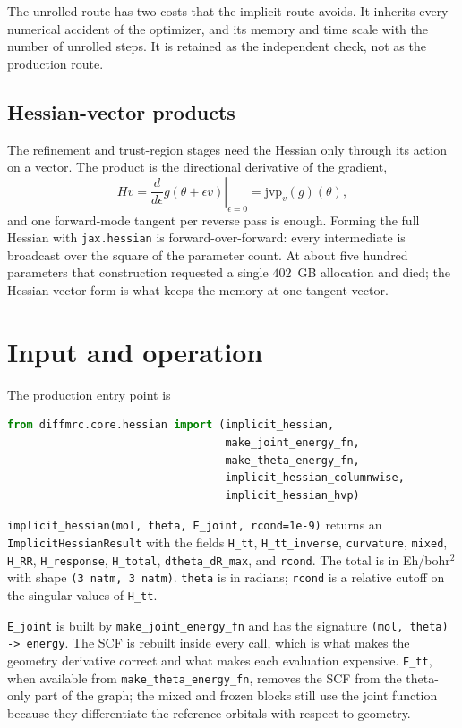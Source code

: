 The unrolled route has two costs that the implicit route avoids.  It
inherits every numerical accident of the optimizer, and its memory and
time scale with the number of unrolled steps.  It is retained as the
independent check, not as the production route.

\subsection{Hessian-vector products}

The refinement and trust-region stages need the Hessian only through
its action on a vector.  The product is the directional derivative of
the gradient,
\begin{equation}
  H v = \left.\frac{d}{d\epsilon}
        g(\theta+\epsilon v)\right|_{\epsilon=0}
      = \mathrm{jvp}_v(g)(\theta),
  \label{eq:hess-hvp}
\end{equation}
and one forward-mode tangent per reverse pass is enough.  Forming the
full Hessian with \texttt{jax.hessian} is forward-over-forward: every
intermediate is broadcast over the square of the parameter count.  At
about five hundred parameters that construction requested a single
$402$~GB allocation and died; the Hessian-vector form is what keeps the
memory at one tangent vector.

\section{Input and operation}
\label{sec:hessian-input}

The production entry point is
\begin{lstlisting}[language=Python]
from diffmrc.core.hessian import (implicit_hessian,
                                  make_joint_energy_fn,
                                  make_theta_energy_fn,
                                  implicit_hessian_columnwise,
                                  implicit_hessian_hvp)
\end{lstlisting}
\texttt{implicit\_hessian(mol, theta, E\_joint, rcond=1e-9)} returns an
\texttt{ImplicitHessianResult} with the fields \texttt{H\_tt},
\texttt{H\_tt\_inverse}, \texttt{curvature}, \texttt{mixed},
\texttt{H\_RR}, \texttt{H\_response}, \texttt{H\_total},
\texttt{dtheta\_dR\_max}, and \texttt{rcond}.  The total is in
Eh/bohr$^{2}$ with shape \texttt{(3 natm, 3 natm)}.  \texttt{theta} is
in radians; \texttt{rcond} is a relative cutoff on the singular values
of \texttt{H\_tt}.

\texttt{E\_joint} is built by \texttt{make\_joint\_energy\_fn} and has
the signature \texttt{(mol, theta) -> energy}.  The SCF is rebuilt
inside every call, which is what makes the geometry derivative correct
and what makes each evaluation expensive.  \texttt{E\_tt}, when
available from \texttt{make\_theta\_energy\_fn}, removes the SCF from
the theta-only part of the graph; the mixed and frozen blocks still use
the joint function because they differentiate the reference orbitals
with respect to geometry.

